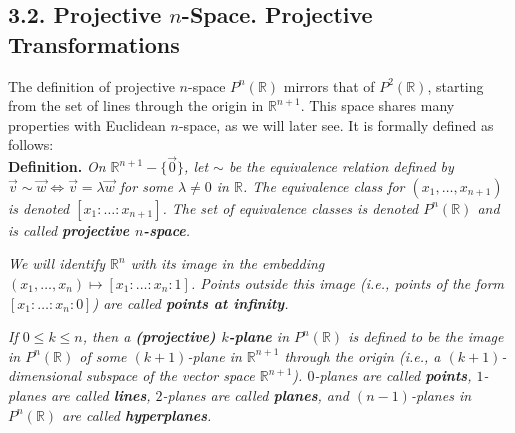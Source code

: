\documentclass[leqno]{book}
\begin{document}
\subsection*{3.2. Projective $n$-Space.  Projective Transformations}
The definition of projective $n$-space $P^n(\mathbb R)$ mirrors that of $P^2(\mathbb R)$, starting from the set of lines through the origin in $\mathbb R^{n+1}$.  This space shares many properties with Euclidean $n$-space, as we will later see.  It is formally defined as follows:\\

\noindent\textbf{Definition.} \emph{On $\mathbb R^{n+1}-\{\vec 0\}$, let $\sim$ be the equivalence relation defined by $\vec v\sim\vec w\iff\vec v=\lambda\vec w$ for some $\lambda\ne 0$ in $\mathbb R$.  The equivalence class for $(x_1,\dots,x_{n+1})$ is denoted $[x_1:\dots:x_{n+1}]$.  The set of equivalence classes is denoted $P^n(\mathbb R)$ and is called \textbf{projective $n$-space}.}

\emph{We will identify $\mathbb R^n$ with its image in the embedding $(x_1,\dots,x_n)\mapsto[x_1:\dots:x_n:1]$.  Points outside this image (i.e., points of the form $[x_1:\dots:x_n:0]$) are called \textbf{points at infinity}.}

\emph{If $0\leqslant k\leqslant n$, then a \textbf{(projective) $k$-plane} in $P^n(\mathbb R)$ is defined to be the image in $P^n(\mathbb R)$ of some $(k+1)$-plane in $\mathbb R^{n+1}$ through the origin (i.e., a $(k+1)$-dimensional subspace of the vector space $\mathbb R^{n+1}$).  $0$-planes are called \textbf{points}, $1$-planes are called \textbf{lines}, $2$-planes are called \textbf{planes}, and $(n-1)$-planes in $P^n(\mathbb R)$ are called \textbf{hyperplanes}.}\\
\end{document}
